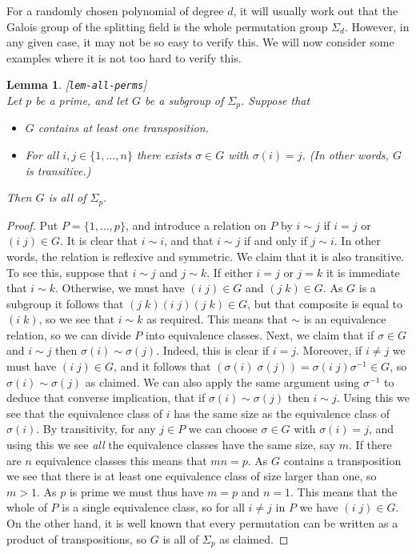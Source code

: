 \documentclass{amsart}
\newcommand{\lbl}[1]{\label{#1}\textup{[\texttt{#1}]}\ \\}
\newcommand{\lbl}{\label}
\newcommand{\sg}        {\sigma}
\newcommand{\Sg}        {\Sigma}
\renewcommand{\:}{\colon}
\newtheorem{lemma}[theorem]{Lemma}
\theoremstyle{definition}
\begin{document}
For a randomly chosen polynomial of degree $d$, it will usually work
out that the Galois group of the splitting field is the whole
permutation group $\Sg_d$.  However, in any given case, it may not be
so easy to verify this.  We will now consider some examples where it
is not too hard to verify this.

\begin{lemma}\lbl{lem-all-perms}
 Let $p$ be a prime, and let $G$ be a subgroup of $\Sg_p$.  Suppose
 that 
 \begin{itemize}
  \item[(a)] $G$ contains at least one transposition.
  \item[(b)] For all $i,j\in\{1,\dotsc,n\}$ there exists $\sg\in G$
   with $\sg(i)=j$.  (In other words, $G$ is transitive.)
 \end{itemize}
 Then $G$ is all of $\Sg_p$.
\end{lemma}
\begin{proof}
 Put $P=\{1,\dotsc,p\}$, and introduce a relation on $P$ by $i\sim j$
 if $i=j$ or $(i\; j)\in G$.  It is clear that $i\sim i$, and that
 $i\sim j$ if and only if $j\sim i$.  In other words, the relation is
 reflexive and symmetric.  We claim that it is also transitive.  To
 see this, suppose that $i\sim j$ and $j\sim k$.  If either $i=j$ or
 $j=k$ it is immediate that $i\sim k$.  Otherwise, we must have
 $(i\;j)\in G$ and $(j\; k)\in G$.  As $G$ is a subgroup it follows
 that $(j\;k)(i\;j)(j\;k)\in G$, but that composite is equal to
 $(i\;k)$, so we see that $i\sim k$ as required.  This means that
 $\sim$ is an equivalence relation, so we can divide $P$ into
 equivalence classes.  Next, we claim that if $\sg\in G$ and $i\sim j$
 then $\sg(i)\sim\sg(j)$.  Indeed, this is clear if $i=j$.  Moreover,
 if $i\neq j$ we must have $(i\;j)\in G$, and it follows that
 $(\sg(i)\;\sg(j))=\sg(i\;j)\sg^{-1}\in G$, so $\sg(i)\sim\sg(j)$ as
 claimed.  We can also apply the same argument using $\sg^{-1}$ to
 deduce that converse implication, that if $\sg(i)\sim\sg(j)$ then
 $i\sim j$.  Using this we see that the equivalence class of $i$ has
 the same size as the equivalence class of $\sg(i)$.  By transitivity,
 for any $j\in P$ we can choose $\sg\in G$ with $\sg(i)=j$, and using
 this we see \emph{all} the equivalence classes have the same size,
 say $m$.  If there are $n$ equivalence classes this means that
 $mn=p$.  As $G$ contains a transposition we see that there is at
 least one equivalence class of size larger than one, so $m>1$.  As
 $p$ is prime we must thus have $m=p$ and $n=1$.  This means that the
 whole of $P$ is a single equivalence class, so for all $i\neq j$ in
 $P$ we have $(i\;j)\in G$.  On the other hand, it is well known that
 every permutation can be written as a product of transpositions, so
 $G$ is all of $\Sg_p$ as claimed.
\end{proof}
\end{document}
